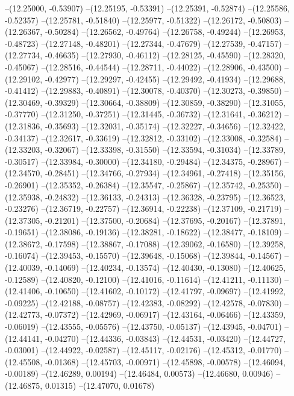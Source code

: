 --(12.25000, -0.53907)
--(12.25195, -0.53391)
--(12.25391, -0.52874)
--(12.25586, -0.52357)
--(12.25781, -0.51840)
--(12.25977, -0.51322)
--(12.26172, -0.50803)
--(12.26367, -0.50284)
--(12.26562, -0.49764)
--(12.26758, -0.49244)
--(12.26953, -0.48723)
--(12.27148, -0.48201)
--(12.27344, -0.47679)
--(12.27539, -0.47157)
--(12.27734, -0.46635)
--(12.27930, -0.46112)
--(12.28125, -0.45590)
--(12.28320, -0.45067)
--(12.28516, -0.44544)
--(12.28711, -0.44022)
--(12.28906, -0.43500)
--(12.29102, -0.42977)
--(12.29297, -0.42455)
--(12.29492, -0.41934)
--(12.29688, -0.41412)
--(12.29883, -0.40891)
--(12.30078, -0.40370)
--(12.30273, -0.39850)
--(12.30469, -0.39329)
--(12.30664, -0.38809)
--(12.30859, -0.38290)
--(12.31055, -0.37770)
--(12.31250, -0.37251)
--(12.31445, -0.36732)
--(12.31641, -0.36212)
--(12.31836, -0.35693)
--(12.32031, -0.35174)
--(12.32227, -0.34656)
--(12.32422, -0.34137)
--(12.32617, -0.33619)
--(12.32812, -0.33102)
--(12.33008, -0.32584)
--(12.33203, -0.32067)
--(12.33398, -0.31550)
--(12.33594, -0.31034)
--(12.33789, -0.30517)
--(12.33984, -0.30000)
--(12.34180, -0.29484)
--(12.34375, -0.28967)
--(12.34570, -0.28451)
--(12.34766, -0.27934)
--(12.34961, -0.27418)
--(12.35156, -0.26901)
--(12.35352, -0.26384)
--(12.35547, -0.25867)
--(12.35742, -0.25350)
--(12.35938, -0.24832)
--(12.36133, -0.24313)
--(12.36328, -0.23795)
--(12.36523, -0.23276)
--(12.36719, -0.22757)
--(12.36914, -0.22238)
--(12.37109, -0.21719)
--(12.37305, -0.21201)
--(12.37500, -0.20684)
--(12.37695, -0.20167)
--(12.37891, -0.19651)
--(12.38086, -0.19136)
--(12.38281, -0.18622)
--(12.38477, -0.18109)
--(12.38672, -0.17598)
--(12.38867, -0.17088)
--(12.39062, -0.16580)
--(12.39258, -0.16074)
--(12.39453, -0.15570)
--(12.39648, -0.15068)
--(12.39844, -0.14567)
--(12.40039, -0.14069)
--(12.40234, -0.13574)
--(12.40430, -0.13080)
--(12.40625, -0.12589)
--(12.40820, -0.12100)
--(12.41016, -0.11614)
--(12.41211, -0.11130)
--(12.41406, -0.10650)
--(12.41602, -0.10172)
--(12.41797, -0.09697)
--(12.41992, -0.09225)
--(12.42188, -0.08757)
--(12.42383, -0.08292)
--(12.42578, -0.07830)
--(12.42773, -0.07372)
--(12.42969, -0.06917)
--(12.43164, -0.06466)
--(12.43359, -0.06019)
--(12.43555, -0.05576)
--(12.43750, -0.05137)
--(12.43945, -0.04701)
--(12.44141, -0.04270)
--(12.44336, -0.03843)
--(12.44531, -0.03420)
--(12.44727, -0.03001)
--(12.44922, -0.02587)
--(12.45117, -0.02176)
--(12.45312, -0.01770)
--(12.45508, -0.01368)
--(12.45703, -0.00971)
--(12.45898, -0.00578)
--(12.46094, -0.00189)
--(12.46289, 0.00194)
--(12.46484, 0.00573)
--(12.46680, 0.00946)
--(12.46875, 0.01315)
--(12.47070, 0.01678)
